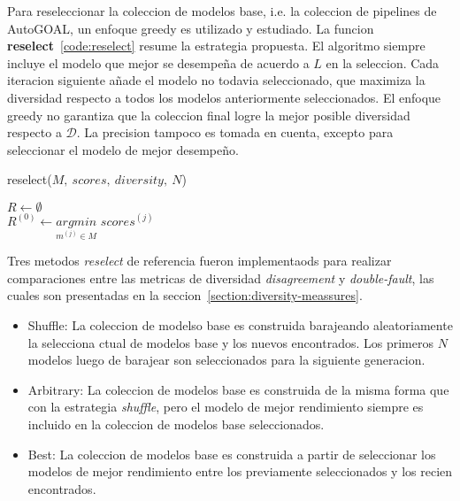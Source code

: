 Para reseleccionar la coleccion de modelos base, i.e. la coleccion de pipelines de AutoGOAL, un enfoque greedy es utilizado y estudiado. La funcion \textbf{reselect}~\ref{code:reselect} resume la estrategia propuesta. El algoritmo siempre incluye el modelo que mejor se desempeña de acuerdo a $L$ en la seleccion. Cada iteracion siguiente añade el modelo no todavia seleccionado, que maximiza la diversidad respecto a todos los modelos anteriormente seleccionados. El enfoque greedy no garantiza que la coleccion final logre la mejor posible diversidad respecto a $\mathcal{D}$. La precision tampoco es tomada en cuenta, excepto para seleccionar el modelo de mejor desempeño.

\begin{function}[htb!]
    \caption{reselect($M,\ scores,\ diversity,\ N$)\label{code:reselect}}

    \init $R \leftarrow \emptyset$ \\
    \init $R^{(0)} \leftarrow \underset{m^{(j)} \in M}{argmin}$ $scores^{(j)}$ \\
    
\end{function}

Tres metodos \textit{reselect} de referencia fueron implementaods para realizar comparaciones entre las metricas de diversidad \textit{disagreement} y \textit{double-fault}, las cuales son presentadas en la seccion~\ref{section:diversity-meassures}.
\begin{itemize}
    \item Shuffle: La coleccion de modelso base es construida barajeando aleatoriamente la selecciona ctual de modelos base y los nuevos encontrados. Los primeros $N$ modelos luego de barajear son seleccionados para la siguiente generacion.
    \item Arbitrary: La coleccion de modelos base es construida de la misma forma que con la estrategia \textit{shuffle}, pero el modelo de mejor rendimiento siempre es incluido en la coleccion de modelos base seleccionados.
    \item Best: La coleccion de modelos base es construida a partir de seleccionar los modelos de mejor rendimiento entre los previamente seleccionados y los recien encontrados.
\end{itemize}

